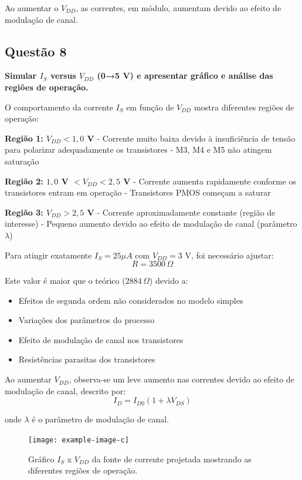 ﻿\documentclass[12pt,a4paper]{article}
\begin{document}
Ao aumentar o $V_{DD}$, as correntes, em módulo, aumentam devido ao efeito de modulação de canal.

\subsection*{Questão 8}
	\textbf{Simular $I_S$ versus $V_{DD}$ (0→5 V) e apresentar gráfico e análise das regiões de operação.}



O comportamento da corrente $I_S$ em função de $V_{DD}$ mostra diferentes regiões de operação:

\textbf{Região 1: $V_{DD} < 1,0$ V}
- Corrente muito baixa devido à insuficiência de tensão para polarizar adequadamente os transistores
- M3, M4 e M5 não atingem saturação

\textbf{Região 2: $1,0$ V $< V_{DD} < 2,5$ V}
- Corrente aumenta rapidamente conforme os transistores entram em operação
- Transistores PMOS começam a saturar

\textbf{Região 3: $V_{DD} > 2,5$ V}
- Corrente aproximadamente constante (região de interesse)
- Pequeno aumento devido ao efeito de modulação de canal (parâmetro $\lambda$)



Para atingir exatamente $I_S = 25 \mu A$ com $V_{DD} = 3$ V, foi necessário ajustar:
$$R = 3500 \, \Omega$$

Este valor é maior que o teórico ($2884 \, \Omega$) devido a:
\begin{itemize}
    \item Efeitos de segunda ordem não considerados no modelo simples
    \item Variações dos parâmetros do processo
    \item Efeito de modulação de canal nos transistores
    \item Resistências parasitas dos transistores
\end{itemize}



Ao aumentar $V_{DD}$, observa-se um leve aumento nas correntes devido ao efeito de modulação de canal, descrito por:
$$I_D = I_{D0}(1 + \lambda V_{DS}) $$

onde $\lambda$ é o parâmetro de modulação de canal.

\begin{figure}[H]
    \centering
    \texttt{[image: example-image-c]}
    \caption{Gráfico $I_S$ x $V_{DD}$ da fonte de corrente projetada mostrando as diferentes regiões de operação.}
    \label{fig:is_vdd}
\end{figure}
\end{document}

